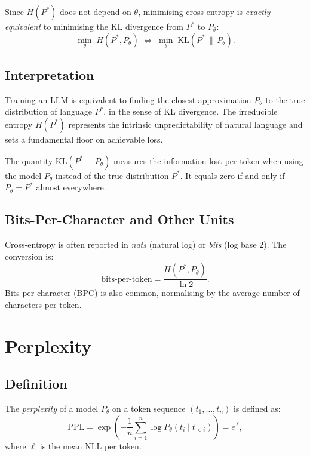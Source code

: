 \documentclass[11pt,a4paper]{article}
\theoremstyle{definition}
\theoremstyle{plain}
\newcommand{\KL}[2]{\mathrm{KL}\!\left(#1\,\|\,#2\right)}
\newcommand{\PPL}{\mathrm{PPL}}
\newcommand{\Hc}{H}
\begin{document}
\noindent
Since $\Hc(P^*)$ does not depend on $\theta$, minimising cross-entropy is
\emph{exactly equivalent} to minimising the KL divergence from $P^*$ to $P_\theta$:
\[
  \min_\theta\;\Hc(P^*, P_\theta)
  \;\Longleftrightarrow\;
  \min_\theta\;\KL{P^*}{P_\theta}.
\]

\subsection{Interpretation}

\begin{keyresult}
Training an LLM is equivalent to finding the closest approximation $P_\theta$
to the true distribution of language $P^*$, in the sense of KL divergence.
The irreducible entropy $\Hc(P^*)$ represents the intrinsic unpredictability
of natural language and sets a fundamental floor on achievable loss.
\end{keyresult}

\noindent
The quantity $\KL{P^*}{P_\theta}$ measures the information lost per token
when using the model $P_\theta$ instead of the true distribution $P^*$.
It equals zero if and only if $P_\theta = P^*$ almost everywhere.

\subsection{Bits-Per-Character and Other Units}

Cross-entropy is often reported in \emph{nats} (natural log) or \emph{bits}
(log base 2). The conversion is:
\[
  \text{bits-per-token}
  = \frac{\Hc(P^*, P_\theta)}{\ln 2}.
\]
Bits-per-character (BPC) is also common, normalising by the average number of
characters per token.

\section{Perplexity}

\subsection{Definition}

\begin{defbox}
The \emph{perplexity} of a model $P_\theta$ on a token sequence $(t_1, \dots, t_n)$
is defined as:
\[
  \PPL
  = \exp\!\left(-\frac{1}{n}\sum_{i=1}^{n} \log P_\theta(t_i \mid t_{<i})\right)
  = e^{\,\ell},
\]
where $\ell$ is the mean NLL per token.
\end{defbox}
\end{document}
